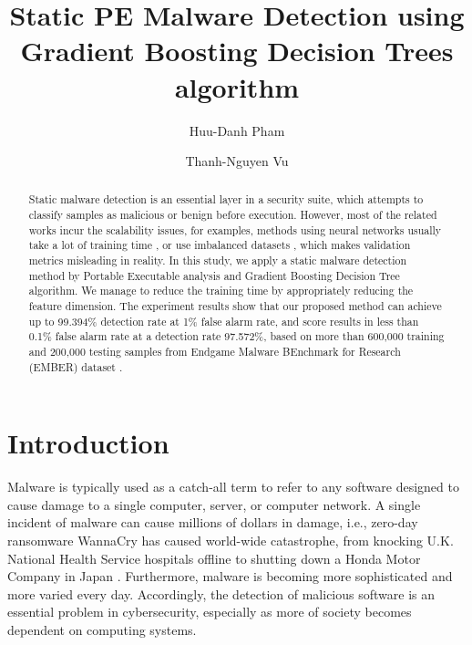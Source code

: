 \documentclass[runningheads]{llncs}
\begin{document}
\title{Static PE Malware Detection using Gradient Boosting Decision Trees algorithm}

\author{Huu-Danh Pham \and Thanh-Nguyen Vu}

%
\maketitle              %
%

\begin{abstract}
Static malware detection is an essential layer in a security suite, which attempts to classify samples as malicious or benign before execution. 
However, most of the related works incur the scalability issues, for examples, methods using neural networks usually take a lot of training time \cite{raff2017malware}, or use imbalanced datasets \cite{saxe2015deep,vu2017metamorphic}, which makes validation metrics misleading in reality.
In this study, we apply a static malware detection method by Portable Executable analysis and Gradient Boosting Decision Tree algorithm. 
We manage to reduce the training time by appropriately reducing the feature dimension. 
The experiment results show that our proposed method can achieve up to 99.394\% detection rate at 1\% false alarm rate, and score results in less than 0.1\% false alarm rate at a detection rate 97.572\%, based on more than 600,000 training and 200,000 testing samples from Endgame Malware BEnchmark for Research (EMBER) dataset \cite{anderson2018ember}.

\end{abstract}
%
%
%
\section{Introduction}

Malware is typically used as a catch-all term to refer to any software designed to cause damage to a single computer, server, or computer network.  
A single incident of malware can cause millions of dollars in damage, i.e., zero-day ransomware WannaCry has caused world-wide catastrophe, from knocking U.K. National Health Service hospitals offline to shutting down a Honda Motor Company in Japan \cite{chen2017automated}. 
Furthermore, malware is becoming more sophisticated and more varied every day. 
Accordingly, the detection of malicious software is an essential problem in cybersecurity, especially as more of society becomes dependent on computing systems.
\end{document}
